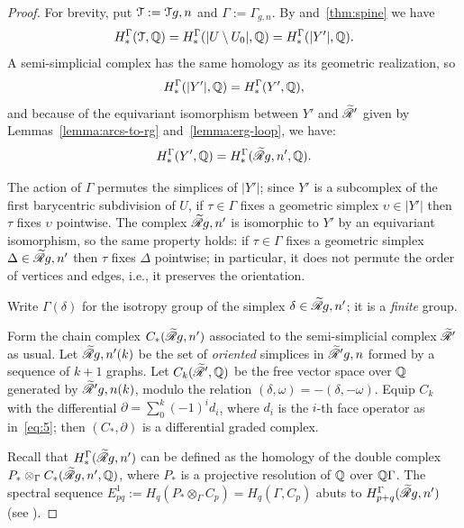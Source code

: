 \begin{proof}
  For brevity, put $\mathcal{T} := \mathcal{T}{g,n}$ and $\Gamma := \Gamma_{g,n}$.  By 
  and~\ref{thm:spine} we have
  \begin{equation*}
    H^\Gamma_*(\mathcal{T}, \mathbb{Q}) = H^\Gamma_*(|U \setminus U_0|, \mathbb{Q}) = H^\Gamma_*(|Y'|, \mathbb{Q}).
  \end{equation*}
  A semi-simplicial complex has the same homology as its geometric
  realization, so
  \begin{equation*}
    H^\Gamma_*(|Y'|, \mathbb{Q}) = H^\Gamma_*(Y', \mathbb{Q}),
  \end{equation*}
  and because of the equivariant isomorphism between $Y'$ and $\mathscr{\widetilde R}_{}'$
  given by Lemmas~\ref{lemma:arcs-to-rg} and~\ref{lemma:erg-loop}, we
  have:
  \begin{equation*}
    H^\Gamma_*(Y', \mathbb{Q}) = H^\Gamma_*(\mathscr{\widetilde R}_{}{g,n}', \mathbb{Q}).
  \end{equation*}

  The action of $\Gamma$ permutes the simplices of $|Y'|$; since $Y'$ is a
  subcomplex of the first barycentric subdivision of $U$, if $\tau \in \Gamma$
  fixes a geometric simplex $\upsilon \in |Y'|$ then $\tau$ fixes $\upsilon$ pointwise.
  The complex $\mathscr{\widetilde R}_{}{g,n}'$ is isomorphic to $Y'$ by an equivariant
  isomorphism, so the same property holds: if $\tau \in \Gamma$ fixes a
  geometric simplex $\Delta \in \mathscr{\widetilde R}_{}{g,n}'$ then $\tau$ fixes $\Delta$ pointwise; in
  particular, it does not permute the order of vertices and edges,
  i.e., it preserves the orientation.

  Write $\Gamma(\delta)$ for the isotropy group of the simplex $\delta \in \mathscr{\widetilde R}_{}{g,n}'$;
  it is a \emph{finite} group.

  Form the chain complex $C_*(\mathscr{\widetilde R}_{}{g,n}')$ associated to the
  semi-simplicial complex $\mathscr{\widetilde R}_{}'$ as usual.  Let $\mathscr{\widetilde R}_{}{g,n}'(k)$ be
  the set of \emph{oriented} simplices in $\mathscr{\widetilde R}_{}'{g,n}$ formed by a
  sequence of $k+1$ graphs.  Let $C_k(\mathscr{\widetilde R}_{}', \mathbb{Q})$ be the free vector
  space over $\mathbb{Q}$ generated by $\mathscr{\widetilde R}_{}'{g,n}(k)$, modulo the relation
  $(\delta, \omega) = -(\delta, -\omega)$.  Equip $C_k$ with the differential $\partial = \sum_0^k
  (-1)^id_i$, where $d_i$ is the $i$-th face operator as
  in~\eqref{eq:5}; then $(C_*, \partial)$ is a differential graded complex.

  Recall that $H^\Gamma_*(\mathscr{\widetilde R}_{}{g,n}')$ can be defined as the homology of
  the double complex $P_* \otimes_\Gamma C_*(\mathscr{\widetilde R}_{}{g,n}', \mathbb{Q})$, where $P_*$ is a
  projective resolution of $\mathbb{Q}$ over $\mathbb{Q}\Gamma$.  The spectral sequence
  $E^1_{pq} := H_q(P_* \otimes_\Gamma C_p) = H_q(\Gamma, C_p)$ abuts to
  $H^\Gamma_{p+q}(\mathscr{\widetilde R}_{}{g,n}')$ (see \cite[VII.5 and VII.7]{brown}).


\end{proof}
